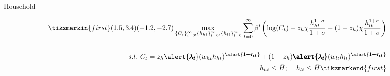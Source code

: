 \documentclass[11pt,aspectratio=169]{beamer}
\begin{document}
\begin{frame}{Household}
\hypertarget{backhh}{}
\vspace{2mm}
\begin{minipage}[t!]{1\textwidth}
	\begin{align*}
	\tikzmarkin{first}(1.5,3.4)(-1.2,-2.7)
 \max_{\{C_t\}_{t=0}^\infty, \{h_{ht}\}_{t=0}^\infty, \{h_{lt}\}_{t=0}^\infty} \sum_{t=0}^\infty \beta^t \left(\log(C_t)-z_h\chi\frac{h_{ht}^{1+\sigma}}{1+\sigma}-(1-z_h)\chi\frac{h_{lt}^{1+\sigma}}{1+\sigma}\right) %
\\
\vspace{4mm}
\\
s.t.\ C_t=z_h \alert{\pmb{\lambda_t}} (w_{ht}h_{ht})^{\alert{\pmb{1-\tau_{\iota t}}}}+(1-z_h) \pmb{\alert{\lambda_t}} (w_{lt}h_{lt})^{\alert{\pmb{1-\tau_{\iota t}}}}%
\\
\hspace{2mm}\ h_{ht}\leq \bar{H}; \hspace{4mm} h_{lt}\leq \bar{H}
	\tikzmarkend{first}
	\end{align*}
\end{minipage}

%


\end{frame}
\end{document}
